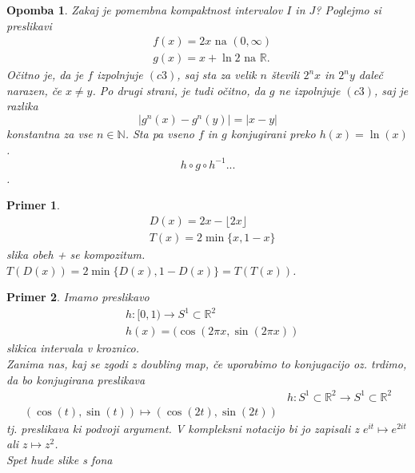 \documentclass{article}
\newtheorem{opomba}{Opomba}
\newtheorem{primer}{Primer}
\newcommand{\N}{\mathbb{N}}
\newcommand{\R}{\mathbb{R}}
\begin{document}
\begin{opomba}
Zakaj je pomembna kompaktnost intervalov $I$ in $J$? Poglejmo si preslikavi 
\begin{align*}
&f(x) = 2x \text{ na } (0, \infty) \\ 
&g(x) = x + \ln 2 \text{ na } \R.
\end{align*}
Očitno je, da je $f$ izpolnjuje $(c3)$, saj sta za velik $n$ števili $2^n x$ in $2^n y$ daleč narazen, če $x\neq y$. Po drugi strani, je tudi očitno, da $g$ ne izpolnjuje $(c3)$, saj je razlika 
$$
|g^n(x) - g^n(y)| = |x-y|
$$
konstantna za vse $n\in \N$. Sta pa vseno $f$ in $g$ konjugirani preko $h(x) = \ln(x)$.
$$
h\circ g\circ h^{-1} ...
$$.
\end{opomba}

\begin{primer}
\begin{align*}
&D(x) = 2x - \lfloor 2x \rfloor \\ 
&T(x) = 2\min\{x, 1-x\}
\end{align*}
slika obeh + se kompozitum.
$T(D(x)) = 2\min\{D(x), 1 - D(x)\} = T(T(x))$.
\end{primer}

\begin{primer}
Imamo preslikavo
\begin{align*}
&h: [0, 1) \rightarrow S^1 \subset \R^2 \\ 
&h(x) = (\cos(2\pi x, \sin(2\pi x))
\end{align*}
slikica intervala v kroznico.\\ 
Zanima nas, kaj se zgodi z doubling map, če uporabimo to konjugacijo oz. trdimo, da bo konjugirana preslikava 
\begin{align*}
&h: S^1 \subset \R^2 \rightarrow S^1 \subset \R^2 \\ 
(\cos(t), \sin(t)) \mapsto (\cos(2t), \sin(2t))
\end{align*}
tj. preslikava ki podvoji argument. V kompleksni notacijo bi jo zapisali z $e^{it} \mapsto e^{2it}$ ali $z \mapsto z^2$. \\ 
Spet hude slike s fona\\ 
\end{primer}
\end{document}
